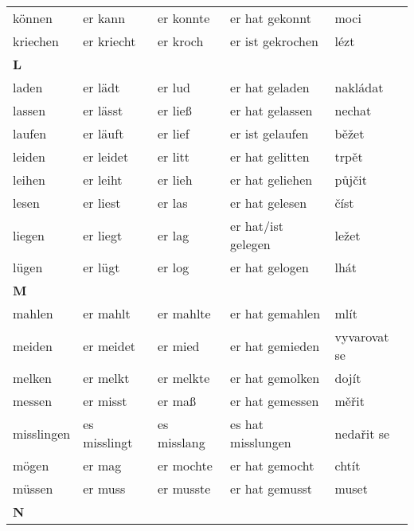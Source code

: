 \documentclass[a4paper,12pt]{report}
\begin{document}
\begin{longtable}{ | m{2cm} | m{2.5cm} | m{2.5cm} | m{4cm} | m{3cm} | }
    können      & er kann       & er konnte    & er hat gekonnt     & moci               \\
    kriechen    & er kriecht    & er kroch     & er ist gekrochen   & lézt               \\
    \hline
    \textbf{L}  &               &              &                    &                    \\
    laden       & er lädt       & er lud       & er hat geladen     & nakládat           \\
    lassen      & er lässt      & er ließ      & er hat gelassen    & nechat             \\
    laufen      & er läuft      & er lief      & er ist gelaufen    & běžet              \\
    leiden      & er leidet     & er litt      & er hat gelitten    & trpět              \\
    leihen      & er leiht      & er lieh      & er hat geliehen    & půjčit             \\
    lesen       & er liest      & er las       & er hat gelesen     & číst               \\
    liegen      & er liegt      & er lag       & er hat/ist gelegen & ležet              \\
    lügen       & er lügt       & er log       & er hat gelogen     & lhát               \\
    \hline
    \textbf{M}  &               &              &                    &                    \\
    mahlen      & er mahlt      & er mahlte    & er hat gemahlen    & mlít               \\
    meiden      & er meidet     & er mied      & er hat gemieden    & vyvarovat se       \\
    melken      & er melkt      & er melkte    & er hat gemolken    & dojít              \\
    messen      & er misst      & er maß       & er hat gemessen    & měřit              \\
    misslingen  & es misslingt  & es misslang  & es hat misslungen  & nedařit se         \\
    mögen       & er mag        & er mochte    & er hat gemocht     & chtít              \\
    müssen      & er muss       & er musste    & er hat gemusst     & muset              \\
    \hline
    \newpage
    \hline
    \textbf{N}  &               &              &                    &                    \\

\end{longtable}
\end{document}
